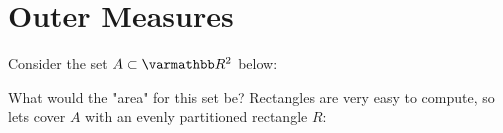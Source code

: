 \section{Outer Measures}
    \iffalse
    Consider the set $A \subset \bfR^2$ below:
        \begin{center}
        \end{center}
    What would the "area" for this set be? Rectangles are very easy to compute, so lets cover $A$ with an evenly partitioned rectangle $R$:
